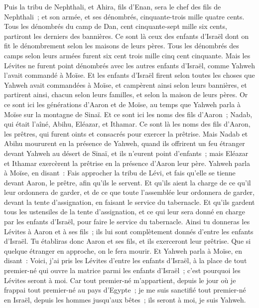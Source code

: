 \begin{multicols}{2}
Puis la tribu de Nephthali, et Ahira, fils d'Enan, sera le chef des fils de Nephthali~;
et son armée, et ses dénombrés, cinquante-trois mille quatre cents.
Tous les dénombrés du camp de Dan, cent cinquante-sept mille six cents, partiront les derniers des bannières.
Ce sont là ceux des enfants d'Israël dont on fit le dénombrement selon les maisons de leurs pères. Tous les dénombrés des camps selon leurs armées furent six cent trois mille cinq cent cinquante.
Mais les Lévites ne furent point dénombrés avec les autres enfants d'Israël, comme Yahweh l'avait commandé à Moïse.
Et les enfants d'Israël firent selon toutes les choses que Yahweh avait commandées à Moïse, et campèrent ainsi selon leurs bannières, et partirent ainsi, chacun selon leurs familles, et selon la maison de leurs pères.
\VerseOne{}Or ce sont ici les générations d'Aaron et de Moïse, au temps que Yahweh parla à Moïse sur la montagne de Sinaï.
Et ce sont ici les noms des fils d'Aaron~; Nadab, qui était l'aîné, Abihu, Eléazar, et Ithamar.
Ce sont là les noms des fils d'Aaron, les prêtres, qui furent oints et consacrés pour exercer la prêtrise.
Mais Nadab et Abihu moururent en la présence de Yahweh, quand ils offrirent un feu étranger devant Yahweh au désert de Sinaï, et ils n'eurent point d'enfants~; mais Eléazar et Ithamar exercèrent la prêtrise en la présence d'Aaron leur père.
Yahweh parla à Moïse, en disant~:
Fais approcher la tribu de Lévi, et fais qu'elle se tienne devant Aaron, le prêtre, afin qu'ils le servent.
Et qu'ils aient la charge de ce qu'il leur ordonnera de garder, et de ce que toute l'assemblée leur ordonnera de garder, devant la tente d'assignation, en faisant le service du tabernacle.
Et qu'ils gardent tous les ustensiles de la tente d'assignation, et ce qui leur sera donné en charge par les enfants d'Israël, pour faire le service du tabernacle.
Ainsi tu donneras les Lévites à Aaron et à ses fils~; ils lui sont complètement donnés d'entre les enfants d'Israël.
Tu établiras donc Aaron et ses fils, et ils exerceront leur prêtrise. Que si quelque étranger en approche, on le fera mourir.
Et Yahweh parla à Moïse, en disant~:
Voici, j'ai pris les Lévites d'entre les enfants d'Israël, à la place de tout premier-né qui ouvre la matrice parmi les enfants d'Israël~; c'est pourquoi les Lévites seront à moi.
Car tout premier-né m'appartient, depuis le jour où je frappai tout premier-né au pays d'Egypte~; je me suis sanctifié tout premier-né en Israël, depuis les hommes jusqu'aux bêtes~; ils seront à moi, je suis Yahweh.

\end{multicols}
